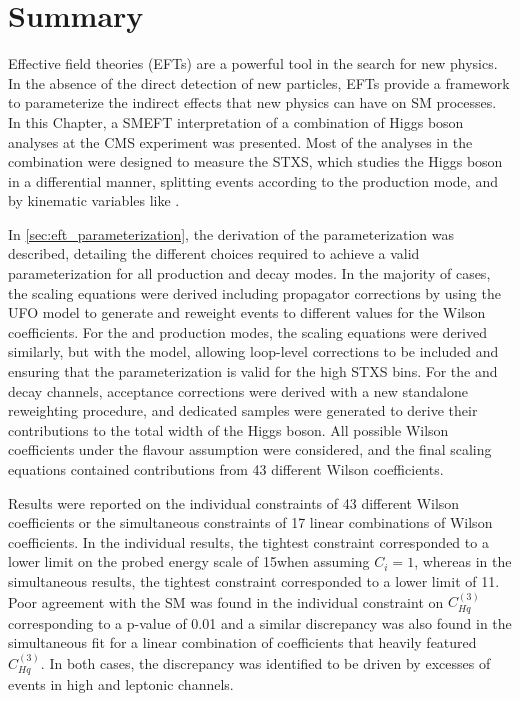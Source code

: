 \section{Summary}\label{sec:eft_conclusion}

Effective field theories (EFTs) are a powerful tool in the search for new physics. In the absence of the direct detection of new particles, EFTs provide a framework to parameterize the indirect effects that new physics can have on SM processes. In this Chapter, a SMEFT interpretation of a combination of Higgs boson analyses at the CMS experiment was presented. Most of the analyses in the combination were designed to measure the STXS, which studies the Higgs boson in a differential manner, splitting events according to the production mode, and by kinematic variables like \ptH. 

In \cref{sec:eft_parameterization}, the derivation of the parameterization was described, detailing the different choices required to achieve a valid parameterization for all production and decay modes. In the majority of cases, the scaling equations were derived including propagator corrections by using the \SMEFTsim UFO model to generate and reweight events to different values for the Wilson coefficients. For the \ggH and \ggZH production modes, the scaling equations were derived similarly, but with the \SMEFTatNLO model, allowing loop-level corrections to be included and ensuring that the parameterization is valid for the high \ptH STXS bins. For the \Hfl and \Hlnulnu decay channels, acceptance corrections were derived with a new standalone reweighting procedure, and dedicated samples were generated to derive their contributions to the total width of the Higgs boson. All possible Wilson coefficients under the \topUtl flavour assumption were considered, and the final scaling equations contained contributions from 43 different Wilson coefficients.

Results were reported on the individual constraints of 43 different Wilson coefficients or the simultaneous constraints of 17 linear combinations of Wilson coefficients. In the individual results, the tightest constraint corresponded to a lower limit on the probed energy scale of 15\TeV when assuming $C_i=1$, whereas in the simultaneous results, the tightest constraint corresponded to a lower limit of 11\TeV. Poor agreement with the SM was found in the individual constraint on $C_{Hq}^{(3)}$ corresponding to a p-value of 0.01 and a similar discrepancy was also found in the simultaneous fit for a linear combination of coefficients that heavily featured $C_{Hq}^{(3)}$. In both cases, the discrepancy was identified to be driven by excesses of events in high \ptV \WH and \ZH leptonic channels. 